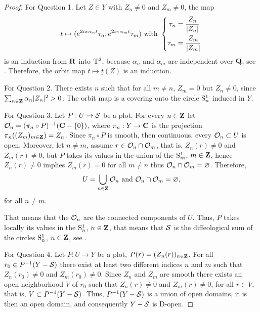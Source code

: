 \begin{proof}
  For Question 1. Let $Z\in Y$ with $ Z_n \neq 0$ and  $ Z_m \neq 0$, the map
  $$
    t \mapsto (e^{2i\pi \alpha_n t}\tau_n, e^{2i\pi \alpha_m t}\tau_m)
    \SpacedText{with}
    \left\{\begin{split} \tau_n &= {Z_n \over \Modulus{Z_n}} \\ %
    \tau_m &= {Z_m \over \Modulus{Z_m}}
    \end{split}
    \right.
    $$
  is an induction from $\mathbf{R}$ into $\mathrm{T}^2$,
  because $\alpha_n$ and $\alpha_m$ are independent over $\mathbf{Q}$,
  see \cite[Exercise 31]{PIZ13}.
  Therefore,
   the orbit map $t \mapsto \underline{t} (Z)$ is an induction.
  
  For Question 2. There exists $n$ such that for all $m \neq n$, $ Z_m = 0$
  but $ Z_n\neq 0$, since $\sum_{n\in\mathbf{Z}} \alpha_n \vert Z_n \vert^2>0$.
  The orbit map is a covering onto the circle $\mathrm{S}^1_n$ induced in $Y$.
  
  For Question 3. Let $P : U \to \mathcal{S}$ be a plot. For every $n \in \mathbf{Z}$ let
  $\mathcal{O}_n = (\pi_n\circ P)^{-1}(\mathbf{C}-\{0\})$, where $\pi_n : Y \to \mathbf{C}$ is the projection
  $\pi_n((Z_m)_{m\in \mathbf{Z}}) =  Z_n$.
  Since $\pi_n \circ P$ is smooth, then continuous, every $\mathcal{O}_n\subset U$ is open. Moreover, let $n\neq m$,
  assume $r \in \mathcal{O}_n\cap\mathcal{O}_m$, that is, $ Z_n(r)\neq 0$ and $ Z_m(r)\neq 0$,
  but $P$ takes its values in
  the union of the $\mathrm{S}^1_m$, $m \in \mathbf{Z}$, hence
  $ Z_n(r)\neq 0$ implies $ Z_m(r) = 0$ for all $m\neq n$ thus $\mathcal{O}_n\cap\mathcal{O}_m = \varnothing$.
  Therefore,
  $$
    U = \bigcup_{n\in \mathbf{Z}} \mathcal{O}_n \ \text{and}\  \mathcal{O}_n \cap \mathcal{O}_m = \varnothing,
    $$
  for all $n\neq m$.
  
  That means that the $\mathcal{O}_n$ are the connected components of $U$. Thus, $P$ takes locally its values in the $\mathrm{S}^1_n$,
  $n\in \mathbf{Z}$, that means that $\mathcal{S}$ is the diffeological sum of the circles $\mathrm{S}^1_n$, $n\in \mathbf{Z}$, see \cite[\textsection\,1.39]{PIZ13}.
  
  For Question 4.
  Let $P:U \to Y$ be a plot, $P (r)=(Z_n(r))_{n \in \mathbf{Z}}$.
  For all $r_0 \in P^{-1}(Y - \mathcal{S})$ there exist at least two different indices $n$ and $m$ such that $ Z_n(r_0)\neq 0$ and $ Z_m(r_0)\neq 0$.
  Since $ Z_n$ and $ Z_m$ are smooth there exists an open neighborhood $V$ of $r_0$ such that $ Z_n(r)\neq 0$ and $ Z_m(r)\neq 0$,
  for all $r \in V$,
  that is,
  $V \subset P^{-1}(Y - \mathcal{S})$.
  Thus, $P^{-1}(Y - \mathcal{S})$ is a union of open domains,
  it is then an open domain,
  and consequently $Y - \mathcal{S}$ is D-open.
\end{proof}

